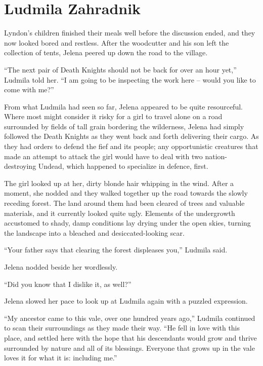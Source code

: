 \chapter{Ludmila Zahradnik}

Lyndon’s children finished their meals well before the discussion ended, and they now looked bored and restless. After the woodcutter and his son left the collection of tents, Jelena peered up down the road to the village.

 

“The next pair of Death Knights should not be back for over an hour yet,” Ludmila told her. “I am going to be inspecting the work here – would you like to come with me?”

 

From what Ludmila had seen so far, Jelena appeared to be quite resourceful. Where most might consider it risky for a girl to travel alone on a road surrounded by fields of tall grain bordering the wilderness, Jelena had simply followed the Death Knights as they went back and forth delivering their cargo. As they had orders to defend the fief and its people; any opportunistic creatures that made an attempt to attack the girl would have to deal with two nation-destroying Undead, which happened to specialize in defence, first.

 

The girl looked up at her, dirty blonde hair whipping in the wind. After a moment, she nodded and they walked together up the road towards the slowly receding forest. The land around them had been cleared of trees and valuable materials, and it currently looked quite ugly. Elements of the undergrowth accustomed to shady, damp conditions lay drying under the open skies, turning the landscape into a bleached and desiccated-looking scar.

 

“Your father says that clearing the forest displeases you,” Ludmila said.

 

Jelena nodded beside her wordlessly.

 

“Did you know that I dislike it, as well?”

 

Jelena slowed her pace to look up at Ludmila again with a puzzled expression.

 

“My ancestor came to this vale, over one hundred years ago,” Ludmila continued to scan their surroundings as they made their way. “He fell in love with this place, and settled here with the hope that his descendants would grow and thrive surrounded by nature and all of its blessings. Everyone that grows up in the vale loves it for what it is: including me.”

